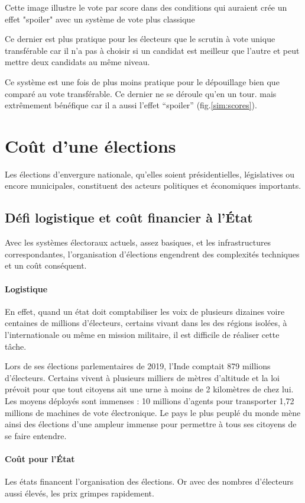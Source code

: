 \documentclass[11pt,a4paper]{report}
\begin{document}
Cette image illustre le vote par score dans des conditions qui auraient crée un effet "spoiler" avec un système de vote plus classique

Ce dernier est plus pratique pour les électeurs que le scrutin à vote unique transférable car il n’a pas à choisir si un candidat est meilleur que l’autre et peut mettre deux candidats au même niveau.

Ce système est une fois de plus moins pratique pour le dépouillage bien que comparé au vote transférable. Ce dernier ne se déroule qu'en un tour. mais extrêmement bénéfique car il a aussi l’effet “spoiler” (fig.\ref{sim:scores}).

\section{Coût d'une élections}
Les élections d'envergure nationale, qu'elles soient présidentielles, législatives ou encore municipales, constituent des acteurs politiques et économiques importants.

\subsection{Défi logistique et coût financier à l'État}
Avec les systèmes électoraux actuels, assez basiques, et les infrastructures correspondantes, l'organisation d'élections engendrent des complexités techniques et un coût conséquent.

\paragraph{Logistique}
En effet, quand un état doit comptabiliser les voix de plusieurs dizaines voire centaines de millions d'électeurs, certains vivant dans les des régions isolées, à l'internationale ou même en mission militaire, il est difficile de réaliser cette tâche.

Lors de ses élections parlementaires de 2019, l'Inde comptait 879 millions d’électeurs.
Certains vivent à plusieurs milliers de mètres d'altitude et la loi prévoit pour que tout citoyens ait une urne à moins de 2 kilomètres de chez lui.
Les moyens déployés sont immenses : 10 millions d'agents pour transporter 1,72 millions de machines de vote électronique.
Le pays le plus peuplé du monde mène ainsi des élections d'une ampleur immense pour permettre à tous ses citoyens de se faire entendre.\nocite{lemonde:inde}

\paragraph{Coût pour l'État}
Les états financent l'organisation des élections. Or avec des nombres d'électeurs aussi élevés, les prix grimpes rapidement.
\end{document}
